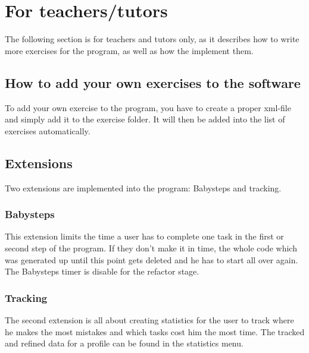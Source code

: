 \documentclass[10pt,a4paper]{article}
\begin{document}
\section{For teachers/tutors}
The following section is for teachers and tutors only, as it describes how to write more exercises for the program, as well as how the implement them.
\subsection{How to add your own exercises to the software}
To add your own exercise to the program, you have to create a proper xml-file and simply add it to the exercise folder. It will then be added into the list of exercises automatically.
\subsection{Extensions}
Two extensions are implemented into the program: Babysteps and tracking.
\subsubsection{Babysteps}
This extension limits the time a user has to complete one task in the first or second step of the program. If they don't make it in time, the whole code which was generated up until this point gets deleted and he has to start all over again.
The Babysteps timer is disable for the refactor stage.
\subsubsection{Tracking}
The second extension is all about creating statistics for the user to track where he makes the most mistakes and which tasks cost him the most time. The tracked and refined data for a profile can be found in the statistics menu.
\end{document}
